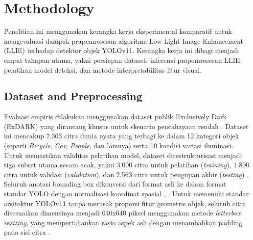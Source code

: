 \documentclass[conference]{IEEEtran}
\begin{document}

\section{Methodology}
Penelitian ini menggunakan kerangka kerja eksperimental komparatif untuk mengevaluasi dampak prapemrosesan algoritma Low-Light Image Enhancement (LLIE) terhadap detektor objek YOLOv11. Kerangka kerja ini dibagi menjadi empat tahapan utama, yakni persiapan dataset, inferensi prapemrosesan LLIE, pelatihan model deteksi, dan metode interpretabilitas fitur visual.

\subsection{Dataset and Preprocessing} Evaluasi empiris dilakukan menggunakan dataset publik Exclusively Dark (ExDARK) yang dirancang khusus untuk skenario pencahayaan rendah \cite{loh2019exdark}. Dataset ini mencakup 7.363 citra dunia nyata yang terbagi ke dalam 12 kategori objek (seperti \textit{Bicycle}, \textit{Car}, \textit{People}, dan lainnya) serta 10 kondisi variasi iluminasi. Untuk memastikan validitas pelatihan model, dataset direstrukturisasi menjadi tiga subset utama secara acak, yakni 3.000 citra untuk pelatihan (\textit{training}), 1.800 citra untuk validasi (\textit{validation}), dan 2.563 citra untuk pengujian akhir (\textit{testing}) \cite{proposal2026sempro}.
Seluruh anotasi bounding box dikonversi dari format asli ke dalam format standar YOLO dengan normalisasi koordinat spasial \cite{padilla2021metrics}, \cite{proposal2026sempro}. Untuk memenuhi standar arsitektur YOLOv11 tanpa merusak proporsi fitur geometris objek, seluruh citra disesuaikan dimensinya menjadi 640x640 piksel menggunakan metode \textit{letterbox resizing}, yang mempertahankan rasio aspek asli dengan menambahkan padding pada sisi citra \cite{proposal2026sempro}.
\end{document}
